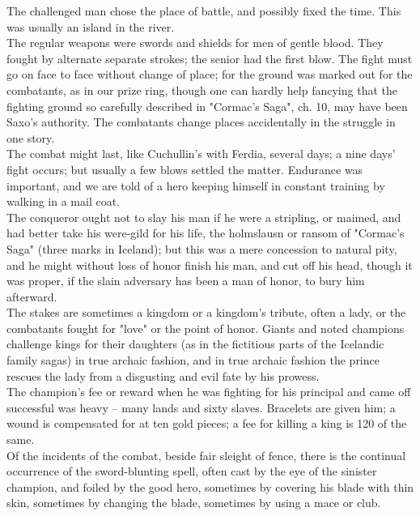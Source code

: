 \documentclass[10pt,a4paper]{report}
\begin{document}
The challenged man chose the place of battle, and possibly fixed the time. This was usually an island in the river.\\

The regular weapons were swords and shields for men of gentle blood. They fought by alternate separate strokes; the senior had the first blow. The fight must go on face to face without change of place; for the ground was marked out for the combatants, as in our prize ring, though one can hardly help fancying that the fighting ground so carefully described in "Cormac's Saga", ch. 10, may have been Saxo's authority. The combatants change places accidentally in the struggle in one story.\\

The combat might last, like Cuchullin's with Ferdia, several days; a nine days' fight occurs; but usually a few blows settled the matter. Endurance was important, and we are told of a hero keeping himself in constant training by walking in a mail coat.\\

The conqueror ought not to slay his man if he were a stripling, or maimed, and had better take his were-gild for his life, the holmslausn or ransom of "Cormac's Saga" (three marks in Iceland); but this was a mere concession to natural pity, and he might without loss of honor finish his man, and cut off his head, though it was proper, if the slain adversary has been a man of honor, to bury him afterward.\\

The stakes are sometimes a kingdom or a kingdom's tribute, often a lady, or the combatants fought for "love" or the point of honor. Giants and noted champions challenge kings for their daughters (as in the fictitious parts of the Icelandic family sagas) in true archaic fashion, and in true archaic fashion the prince rescues the lady from a disgusting and evil fate by his prowess.\\

The champion's fee or reward when he was fighting for his principal and came off successful was heavy -- many lands and sixty slaves. Bracelets are given him; a wound is compensated for at ten gold pieces; a fee for killing a king is 120 of the same.\\

Of the incidents of the combat, beside fair sleight of fence, there is the continual occurrence of the sword-blunting spell, often cast by the eye of the sinister champion, and foiled by the good hero, sometimes by covering his blade with thin skin, sometimes by changing the blade, sometimes by using a mace or club.\\
\end{document}
